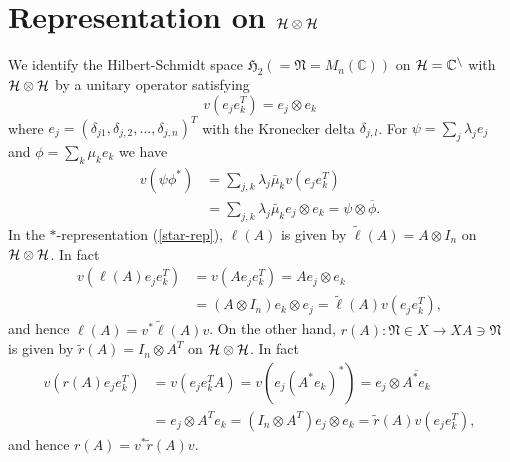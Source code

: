 \section{Representation on $\cal{H}\otimes\cal{H}$}

 We identify the Hilbert-Schmidt space $\mathfrak{H}_2(=\mathfrak{N}=M_n(\mathbb{C}))$ on $\cal{H}=\mathbb{C}^n$ with $\cal{H}\otimes\cal{H}$
by a unitary operator satisfying 
$$
v(e_je_k^T)=e_j\otimes e_k
$$
where $e_j=(\delta_{j1},\delta_{j,2},...,\delta_{j,n})^T$ with the Kronecker delta $\delta_{j,l}$. 
For $\psi=\sum_j \lambda_j e_j$ and $\phi=\sum_k \mu_k e_k$
we have
\begin{equation}
\begin{split}
v(\psi\phi^\ast)&=\sum_{j,k}\lambda_j\bar{\mu}_k v(e_je_k^T)\\
&=\sum_{j,k}\lambda_j\bar{\mu}_k e_j\otimes e_k={\psi}\otimes \overline{\phi}.
\end{split}
\end{equation}
In the $\ast$-representation (\ref{star-rep}), $\ell(A)$ is given by $\tilde{\ell}(A)=A\otimes I_n$ on $\cal{H}\otimes\cal{H}$.
In fact
 \begin{equation}
 \begin{split}
 v(\ell(A)e_je_k^T)&=v(Ae_je_k^T)=Ae_j\otimes e_k\\
 &= (A\otimes I_n)e_k\otimes  e_j=\tilde{\ell}(A)v(e_je_k^T),
 \end{split} 
 \end{equation}
 and hence $\ell(A)=v^{\ast}\tilde{\ell}(A)v$. 
On the other hand, $r(A):\mathfrak{N}\in X \to XA\ni\mathfrak{N}$ is 
given by $\tilde{r}(A)=I_n\otimes A^T$ on $\cal{H}\otimes\cal{H}$.
In fact
 \begin{equation}
 \begin{split}
 v(r(A)e_je_k^T)&=v(e_je_k^TA)=v(e_j(A^\ast e_k)^\ast)=e_j\otimes \overline{A^\ast e_k}\\
 &= e_j \otimes A^T e_k= (I_n\otimes A^T)e_j\otimes  e_k=\tilde{r}(A)v(e_je_k^T),
 \end{split} 
 \end{equation}
 and hence $r(A)=v^{\ast}\tilde{r}(A) v$. 
